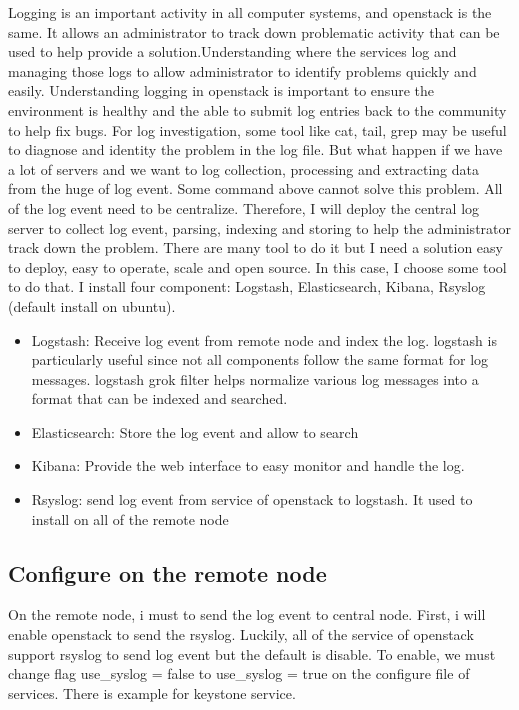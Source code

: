 

Logging is an important activity in all computer systems, and openstack is the same. It allows an administrator to track down problematic activity that can be used to help provide a solution.Understanding where the services log and managing those logs to allow administrator to identify problems quickly and easily. 
Understanding logging in openstack is important to ensure the  environment is healthy and the able to submit log entries back to the community to help fix bugs. For log investigation, some tool like cat, tail, grep may be useful to diagnose and identity the problem in the log file. But what happen if we have a lot of servers and we want to log collection, processing and extracting data from the huge of log event. Some command above cannot solve this problem. All of the log event need to be centralize. Therefore, I will deploy the central log server to collect log event, parsing, indexing and storing to help the administrator track down the problem. 
There are many tool to do it but I need a solution easy to deploy, easy to operate, scale and open source. In this case, I choose some tool to do that. I install four component: Logstash, Elasticsearch, Kibana, Rsyslog (default install on ubuntu).
	
\begin{itemize}
	\item Logstash: Receive log event from remote node and index the log. logstash is particularly useful since not all components follow the same format for log messages. logstash grok filter helps normalize various log messages into a format that can be indexed and searched.
	\item Elasticsearch: Store the log event and allow to search  
	\item Kibana: Provide the web interface to easy monitor and handle the log.
	\item Rsyslog: send log event from service of openstack to logstash. It used to install on all of the remote node 
\end{itemize}

\subsection{Configure on the remote node}
On the remote node, i must to send the log event to central node.
First, i will enable openstack to send the rsyslog. Luckily, all of the service of openstack support rsyslog to send log event but the default is disable. To enable, we must change flag use\_syslog = false
 to use\_syslog = true on the configure file of services. There is example for keystone service.
	
